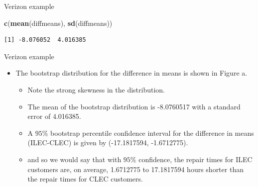 \documentclass[
  ignorenonframetext,
]{beamer}
\newenvironment{Shaded}{\begin{snugshade}}{\end{snugshade}}
\newcommand{\FunctionTok}[1]{\textcolor[rgb]{0.13,0.29,0.53}{\textbf{#1}}}
\newcommand{\NormalTok}[1]{#1}
\providecommand{\tightlist}{%
  \setlength{\itemsep}{0pt}\setlength{\parskip}{0pt}}
\begin{document}
\begin{frame}[fragile]{Verizon example}
\begin{Shaded}
\begin{Highlighting}[]
\FunctionTok{c}\NormalTok{(}\FunctionTok{mean}\NormalTok{(diffmeans), }\FunctionTok{sd}\NormalTok{(diffmeans))}
\end{Highlighting}
\end{Shaded}

\begin{verbatim}
[1] -8.076052  4.016385
\end{verbatim}

\normalsize
\end{frame}

\begin{frame}{Verizon example}
\protect\hypertarget{verizon-example-8}{}
\begin{itemize}
\item
  The bootstrap distribution for the difference in means is shown in
  Figure a.

  \begin{itemize}
  \tightlist
  \item
    Note the strong skewness in the distribution.
  \item
    The mean of the bootstrap distribution is -8.0760517 with a standard
    error of 4.016385.
  \item
    A \(95\%\) bootstrap percentile confidence interval for the
    difference in means (ILEC-CLEC) is given by (-17.1817594,
    -1.6712775).
  \item
    and so we would say that with \(95\%\) confidence, the repair times
    for ILEC customers are, on average, 1.6712775 to 17.1817594 hours
    shorter than the repair times for CLEC customers.
  \end{itemize}
\end{itemize}
\end{frame}
\end{document}
